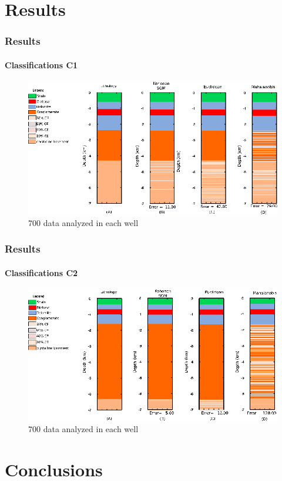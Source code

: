 \documentclass[aspectratio=10]{beamer} %
\begin{document}
\section{Results}

\begin{frame}
\frametitle{Results}
\framesubtitle{Classifications C1}
	\begin{figure}[H]
		\centering
		 \includegraphics[scale=0.35]{Imagens/IDC1020118.eps}
		\caption{$700$ data analyzed in each well}
		\label{C1}
	\end{figure}
\end{frame}

\begin{frame}
\frametitle{Results}
\framesubtitle{Classifications C2}
	\begin{figure}[H]
		\centering
		\includegraphics[scale=0.35]{Imagens/IDC2020118.eps}
        \caption{$700$ data analyzed in each well}
		\label{C2}
	\end{figure}
\end{frame}

\section{Conclusions}
\end{document}
